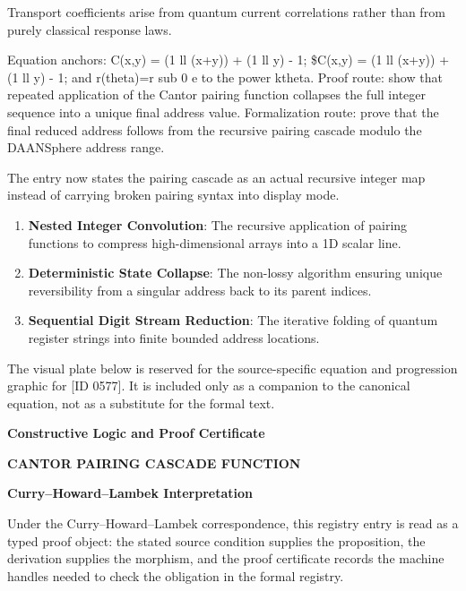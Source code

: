 Transport coefficients arise from quantum current correlations rather than from purely classical response laws.

Equation anchors: C(x,y) = (1 ll (x+y)) + (1 ll y) - 1; \$C(x,y) = (1 ll (x+y)) + (1 ll y) - 1; and r(theta)=r sub 0 e to the power ktheta. Proof route: show that repeated application of the Cantor pairing function collapses the full integer sequence into a unique final address value. Formalization route: prove that the final reduced address follows from the recursive pairing cascade modulo the DAANSphere address range.

The entry now states the pairing cascade as an actual recursive integer map instead of carrying broken pairing syntax into display mode.
\endgroup

\begin{enumerate}[leftmargin=1.6em,itemsep=6pt,topsep=4pt]
\item \textbf{Nested Integer Convolution}: The recursive application of pairing functions to compress high-dimensional arrays into a 1D scalar line.
\item \textbf{Deterministic State Collapse}: The non-lossy algorithm ensuring unique reversibility from a singular address back to its parent indices.
\item \textbf{Sequential Digit Stream Reduction}: The iterative folding of quantum register strings into finite bounded address locations.
\end{enumerate}

\begingroup\footnotesize\sloppy
The visual plate below is reserved for the source-specific equation and progression graphic for [ID 0577]. It is included only as a companion to the canonical equation, not as a substitute for the formal text.
\par\endgroup
\ifTZPDarkEdition
{}
\fi

\clearpage
\begingroup\tzpsupportsetup
\noindent\textbf{\fontsize{10.8pt}{12.8pt}\selectfont [ID 0577] Constructive Logic and Proof Certificate}\par
\noindent\textbf{\fontsize{10pt}{12pt}\selectfont CANTOR PAIRING CASCADE FUNCTION}\par
\vspace{0.45em}
\begingroup
\footnotesize
\setlength{\parskip}{0.22em}
\setlength{\parindent}{0pt}
\noindent\textbf{Curry--Howard--Lambek Interpretation}\par
Under the Curry--Howard--Lambek correspondence, this registry entry is read as a typed proof
object: the stated source condition supplies the proposition, the derivation supplies the
morphism, and the proof certificate records the machine handles needed to check the obligation
in the formal registry.

